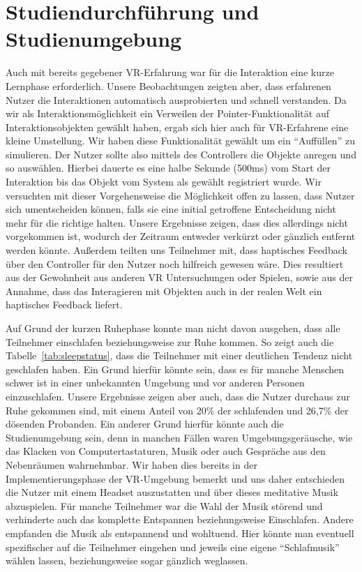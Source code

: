 \section{Studiendurchführung und Studienumgebung}

Auch mit bereits gegebener VR-Erfahrung war für die Interaktion eine kurze Lernphase erforderlich.
Unsere Beobachtungen zeigten aber, dass erfahrenen Nutzer die Interaktionen automatisch ausprobierten und schnell verstanden. 
Da wir als Interaktionsmöglichkeit ein Verweilen der Pointer-Funktionalität auf Interaktionsobjekten gewählt haben, ergab sich hier auch für VR-Erfahrene eine kleine Umstellung. Wir haben diese Funktionalität gewählt um ein "`Auffüllen"' zu simulieren. Der Nutzer sollte also mittels des Controllers die Objekte anregen und so auswählen.
Hierbei dauerte es eine halbe Sekunde (500ms) vom Start der Interaktion bis das Objekt vom System als gewählt registriert wurde. Wir versuchten mit dieser Vorgehensweise die Möglichkeit offen zu lassen, dass Nutzer sich umentscheiden können, falls sie eine initial getroffene Entscheidung nicht mehr für die richtige halten. 
Unsere Ergebnisse zeigen, dass dies allerdings nicht vorgekommen ist, wodurch der Zeitraum entweder verkürzt oder gänzlich entfernt werden könnte. 
Außerdem teilten uns Teilnehmer mit, dass haptisches Feedback über den Controller für den Nutzer noch hilfreich gewesen wäre. Dies resultiert aus der Gewohnheit aus anderen VR Untersuchungen oder Spielen, sowie aus der Annahme, dass das Interagieren mit Objekten auch in der realen Welt ein haptisches Feedback liefert.

Auf Grund der kurzen Ruhephase konnte man nicht davon ausgehen, dass alle Teilnehmer einschlafen beziehungsweise zur Ruhe kommen. So zeigt auch die Tabelle~\ref{tab:sleepstatus}, dass die Teilnehmer mit einer deutlichen Tendenz nicht geschlafen haben. 
Ein Grund hierfür könnte sein, dass es für manche Menschen schwer ist in einer unbekannten Umgebung und vor anderen Personen einzuschlafen. Unsere Ergebnisse zeigen aber auch, dass die Nutzer durchaus zur Ruhe gekommen sind, mit einem Anteil von 20\% der schlafenden und 26,7\% der dösenden Probanden. 
Ein anderer Grund hierfür könnte auch die Studienumgebung sein, denn in manchen Fällen waren Umgebungsgeräusche, wie das Klacken von Computertastaturen, Musik oder auch Gespräche aus den Nebenräumen wahrnehmbar. Wir haben dies bereits in der Implementierungsphase der VR-Umgebung bemerkt und uns daher entschieden die Nutzer mit einem Headset auszustatten und über dieses meditative Musik abzuspielen.
Für manche Teilnehmer war die Wahl der Musik störend und verhinderte auch das komplette Entspannen beziehungsweise Einschlafen. 
Andere empfanden die Musik als entspannend und wohltuend. 
Hier könnte man eventuell spezifischer auf die Teilnehmer eingehen und jeweils eine eigene "`Schlafmusik"' wählen lassen, beziehungsweise sogar gänzlich weglassen.

